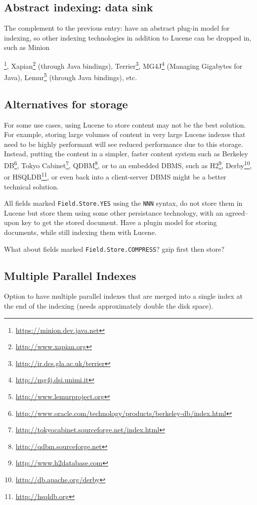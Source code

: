 \subsection{Abstract indexing: data sink}
The complement to the previous entry: have an abstract plug-in model for
indexing, so other indexing technologies in addition to Lucene can be dropped
in, such as Minion{\footnote{\url{https://minion.dev.java.net}},
Xapian\footnote{\url{http://www.xapian.org}} (through Java bindings),
Terrier\footnote{\url{http://ir.dcs.gla.ac.uk/terrier}},
MG4J\footnote{\url{http://mg4j.dsi.unimi.it}} (Managing Gigabytes for Java),
Lemur\footnote{\url{http://www.lemurproject.org}} (through Java bindings),
etc. 


\subsection{Alternatives for storage}
For some use cases, using Lucene to store content may not be the best
solution.
For example, storing large volumes of content in very large Lucene indexes
that need to be highly performant will see reduced performance due to this
storage.
Instead, putting the content in a simpler, faster content system such as 
Berkeley
DB\footnote{\url{http://www.oracle.com/technology/products/berkeley-db/index.html}},   
Tokyo Cabinet\footnote{\url{http://tokyocabinet.sourceforge.net/index.html}},
QDBM\footnote{\url{http://qdbm.sourceforge.net}}, or to an embedded DBMS, such
as H2\footnote{\url{http://www.h2database.com}}, 
Derby\footnote{\url{http://db.apache.org/derby}},
or HSQLDB\footnote{\url{http://hsqldb.org}}, 
or even back into a client-server DBMS might be a better technical solution. 

All fields marked {\tt Field.Store.YES} using the {\tt NNN} syntax, do not
store them in Lucene but store them using some other persistance technology,
with an agreed--upon key to get the stored document. Have a plugin model for
storing documents, while still indexing them with Lucene. 

What about fields marked {\tt Field.Store.COMPRESS}? gzip first then store?



\subsection{Multiple Parallel Indexes}
Option to have multiple parallel indexes that are merged into a single index
at the end of the indexing (needs approximately double the disk space).

}
